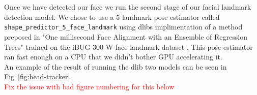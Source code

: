 Once we have detected our face we run the second stage of our facial landmark detection model. We chose to use a 5 landmark pose estimator called \texttt{ shape\_predictor\_5\_face\_landmark} using dlibs implimentation of a method preposed in "One millisecond Face Alignment with an Ensemble of Regression Trees"  trained on the iBUG 300-W face landmark dataset \tocite. This pose estimator ran fast enough on a CPU that we didn't bother GPU accelerating it. \\

An example of the result of running the dlib two models can be seen in Fig~\ref{fig:head-tracker} \\
\textcolor{red}{Fix the issue with bad figure numbering for this below}
\begin{invisBox}  
	\hfill
\end{invisBox}


